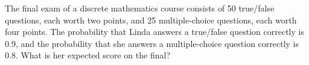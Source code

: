\documentclass[../main.tex]{subfiles}
\begin{document}
The final exam of a discrete mathematics course consists of 50 true/false questions, each worth two points, and 25 multiple-choice questions, each worth four points.
The probability that Linda answers a true/false question correctly is 0.9, and the probability that she answers a multiple-choice question correctly is 0.8.
What is her expected score on the final?

\solution
\end{document}
